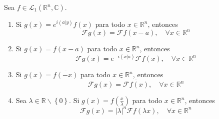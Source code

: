 \documentclass[12pt]{report}
\theoremstyle{largebreak}
\newcommand\abs[1]{\ensuremath{\left|#1\right|}}
\newcommand\pint[2]{\ensuremath{\left(#1\big| #2\right)}}
\newcommand\conj[1]{\ensuremath{\overline{#1}}}
\newcommand{\fou}[1]{\ensuremath{\mathcal{F}#1}}
\begin{document}
    \begin{propo}
        Sea $f\in\mathcal{L}_1(\mathbb{R}^n,\mathbb{C})$.
        \begin{enumerate}
            \item Si $g(x)=e^{i\pint{a}{y}}f(x)$ para todo $x\in\mathbb{R}^n$, entonces
            \begin{equation*}
                \fou{g}(x)=\fou{f}(x-a),\quad\forall x\in\mathbb{R}^n
            \end{equation*}
            \item Si $g(x)=f(x-a)$ para todo $x\in\mathbb{R}^n$, entonces
            \begin{equation*}
                \fou{g}(x)=e^{ -i\pint{x}{a}}\fou{f}(x),\quad\forall x\in\mathbb{R}^n
            \end{equation*}
            \item Si $g(x)=\conj{f(-x)}$ para todo $x\in\mathbb{R}^n$, entonces
            \begin{equation*}
                \fou{g}(x)=\conj{\fou{f}(x)},\quad\forall x\in\mathbb{R}^n
            \end{equation*}
            \item Sea $\lambda\in\mathbb{R}\backslash\left\{0\right\}$. Si $g(x)=f(\frac{x}{\lambda})$ para todo $x\in\mathbb{R}^n$, entonces
            \begin{equation*}
                \fou{g}(x)=\abs{\lambda}^n\fou{f}(\lambda x),\quad\forall x\in\mathbb{R}^n
            \end{equation*}
        \end{enumerate}
    \end{propo}
\end{document}
